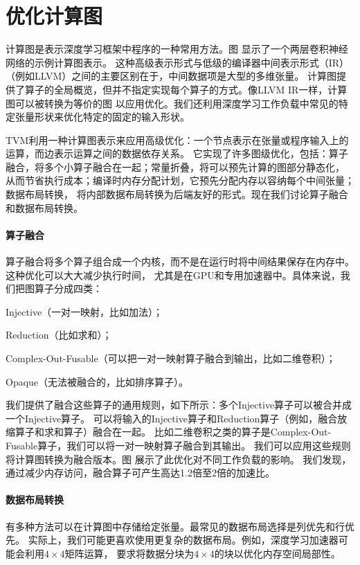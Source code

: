 \section{优化计算图}
计算图是表示深度学习框架中程序的一种常用方法。图 显示了一个两层卷积神经网络的示例计算图表示。
这种高级表示形式与低级的编译器中间表示形式（IR）（例如LLVM）之间的主要区别在于，中间数据项是大型的多维张量。
计算图提供了算子的全局概览，但并不指定实现每个算子的方式。像LLVM IR一样，计算图可以被转换为等价的图
以应用优化。我们还利用深度学习工作负载中常见的特定张量形状来优化特定的固定的输入形状。

TVM利用一种计算图表示来应用高级优化：一个节点表示在张量或程序输入上的运算，而边表示运算之间的数据依存关系。
它实现了许多图级优化，包括：算子融合，将多个小算子融合在一起；常量折叠，将可以预先计算的图部分静态化，
从而节省执行成本；编译时内存分配计划，它预先分配内存以容纳每个中间张量；数据布局转换，
将内部数据布局转换为后端友好的形式。现在我们讨论算子融合和数据布局转换。

\paragraph{算子融合}
算子融合将多个算子组合成一个内核，而不是在运行时将中间结果保存在内存中。这种优化可以大大减少执行时间，
尤其是在GPU和专用加速器中。具体来说，我们把图算子分成四类：
\begin{enumerate*}
    \item Injective（一对一映射，比如加法）；
    \item Reduction（比如求和）；
    \item Complex-Out-Fusable（可以把一对一映射算子融合到输出，比如二维卷积）；
    \item Opaque（无法被融合的，比如排序算子）。
\end{enumerate*}
我们提供了融合这些算子的通用规则，如下所示：多个Injective算子可以被合并成一个Injective算子。
可以将输入的Injective算子和Reduction算子（例如，融合放缩算子和求和算子）融合在一起。
比如二维卷积之类的算子是Complex-Out-Fusable算子，我们可以将一对一映射算子融合到其输出。
我们可以应用这些规则将计算图转换为融合版本。图 展示了此优化对不同工作负载的影响。
我们发现，通过减少内存访问，融合算子可产生高达1.2倍至2倍的加速比。

\paragraph{数据布局转换}
有多种方法可以在计算图中存储给定张量。最常见的数据布局选择是列优先和行优先。
实际上，我们可能更喜欢使用更复杂的数据布局。例如，深度学习加速器可能会利用$4\times 4$矩阵运算，
要求将数据分块为$4\times 4$的块以优化内存空间局部性。

